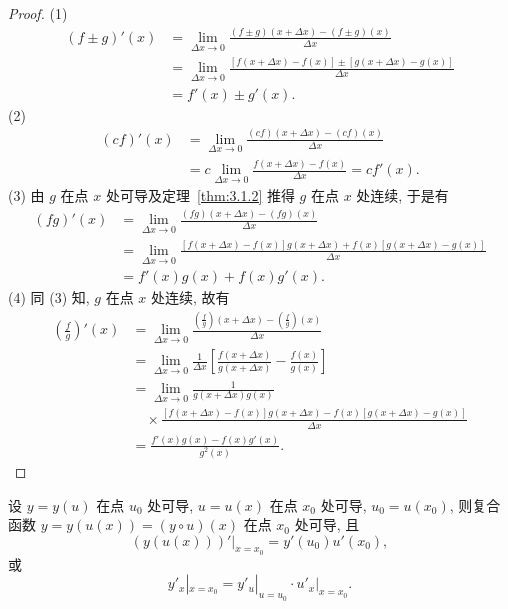 \begin{proof}
(1)
\[
\begin{aligned}
(f \pm g)'(x) &= \lim_{\Delta x\to0}\frac{(f \pm g)(x+\Delta x) - (f \pm g)(x)}{\Delta x}\\
&= \lim_{\Delta x\to0}\frac{[f(x+\Delta x) - f(x)] \pm [g(x+\Delta x) - g(x)]}{\Delta x}\\
&= f'(x) \pm g'(x).
\end{aligned}
\]
(2)
\[
\begin{aligned}
(cf)'(x) &= \lim_{\Delta x\to0}\frac{(cf)(x+\Delta x) - (cf)(x)}{\Delta x}\\
&= c\lim_{\Delta x\to0}\frac{f(x+\Delta x) - f(x)}{\Delta x} = cf'(x).
\end{aligned}
\]
(3) 由 $g$ 在点 $x$ 处可导及定理~\ref{thm:3.1.2} 推得 $g$ 在点 $x$ 处连续, 于是有
\[
\begin{aligned}
(fg)'(x) &= \lim_{\Delta x\to0}\frac{(fg)(x+\Delta x) - (fg)(x)}{\Delta x}\\
&= \lim_{\Delta x\to0}\frac{[f(x+\Delta x) - f(x)]g(x+\Delta x) + f(x)[g(x+\Delta x) - g(x)]}{\Delta x}\\
&= f'(x)g(x) + f(x)g'(x).
\end{aligned}
\]
(4) 同 (3) 知, $g$ 在点 $x$ 处连续, 故有
\[
\begin{aligned}
\left(\frac{f}{g}\right)'(x) &= \lim_{\Delta x\to0}\frac{\left(\frac{f}{g}\right)(x+\Delta x) - \left(\frac{f}{g}\right)(x)}{\Delta x}\\
&= \lim_{\Delta x\to0}\frac{1}{\Delta x}\left[\frac{f(x+\Delta x)}{g(x+\Delta x)} - \frac{f(x)}{g(x)}\right]\\
&= \lim_{\Delta x\to0}\frac{1}{g(x+\Delta x)g(x)}\\
&\quad\times\frac{[f(x+\Delta x) - f(x)]g(x+\Delta x) - f(x)[g(x+\Delta x) - g(x)]}{\Delta x}\\
&= \frac{f'(x)g(x) - f(x)g'(x)}{g^2(x)}.
\end{aligned}
\]
\end{proof}

\begin{theorem}\label{thm:3.1.4}
设 $y = y(u)$ 在点 $u_0$ 处可导, $u = u(x)$ 在点 $x_0$ 处可导, $u_0 = u(x_0)$, 则复合函数 $y = y(u(x)) = (y \circ u)(x)$ 在点 $x_0$ 处可导, 且
\[
\left(y(u(x))\right)'|_{x=x_0} = y'(u_0)u'(x_0),
\]
或
\[
y'_x|_{x=x_0} = y'_u|_{u=u_0}\cdot u'_x|_{x=x_0}.
\]
\end{theorem}

